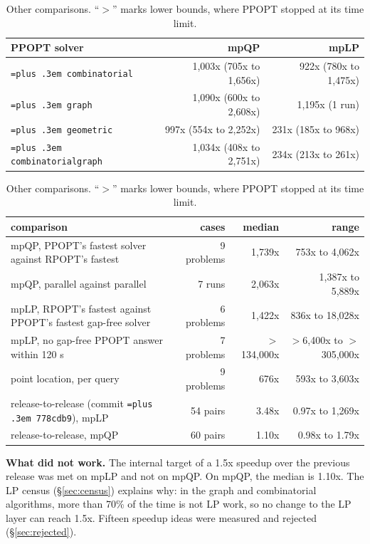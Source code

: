\documentclass[10pt,a4paper]{article}
\newcommand{\rpopt}{RPOPT}
\newcommand{\ppopt}{PPOPT}
\newcommand{\code}[1]{{\let\_\bu\texttt{\spaceskip=\fontdimen2\font plus .3em #1}}}
\newcommand{\bu}{\textunderscore\hspace{0pt}}
\begin{document}
\begin{table}[!htbp]
\centering\small
\caption{Speedup over each \ppopt{} solver, same algorithm, one thread, runs where \ppopt{} finished with a gap-free answer: median (range).}
\label{tab:solvers}
\begin{tabular}{@{}lrr@{}}
\toprule
\ppopt{} solver & mpQP & mpLP \\
\midrule
\code{combinatorial} & 1,003x (705x to 1,656x) & 922x (780x to 1,475x) \\
\code{graph} & 1,090x (600x to 2,608x) & 1,195x (1 run) \\
\code{geometric} & 997x (554x to 2,252x) & 231x (185x to 968x) \\
\code{combinatorial\_graph} & 1,034x (408x to 2,751x) & 234x (213x to 261x) \\
\bottomrule
\end{tabular}

\vspace{1.2em}
\caption{Other comparisons. ``$>$'' marks lower bounds, where \ppopt{} stopped at its time limit.}
\label{tab:headline}
\begin{tabular}{@{}lrrr@{}}
\toprule
comparison & cases & median & range \\
\midrule
mpQP, \ppopt{}'s fastest solver against \rpopt{}'s fastest & 9 problems & 1,739x & 753x to 4,062x \\
mpQP, parallel against parallel & 7 runs & 2,063x & 1,387x to 5,889x \\
mpLP, \rpopt{}'s fastest against \ppopt{}'s fastest gap-free solver & 6 problems & 1,422x & 836x to 18,028x \\
mpLP, no gap-free \ppopt{} answer within 120 s & 7 problems & $>$134,000x & $>$6,400x to $>$305,000x \\
point location, per query & 9 problems & 676x & 593x to 3,603x \\
release-to-release (commit \code{778cdb9}), mpLP & 54 pairs & 3.48x & 0.97x to 1,269x \\
release-to-release, mpQP & 60 pairs & 1.10x & 0.98x to 1.79x \\
\bottomrule
\end{tabular}
\end{table}

\textbf{What did not work.} The internal target of a 1.5x speedup over the previous release was met on mpLP and not on mpQP.
On mpQP, the median is 1.10x. The LP census (\S\ref{sec:census}) explains why: in the graph and combinatorial algorithms, more than 70\% of
the time is not LP work, so no change to the LP layer can reach 1.5x. Fifteen speedup ideas were measured and rejected
(\S\ref{sec:rejected}).
\end{document}
